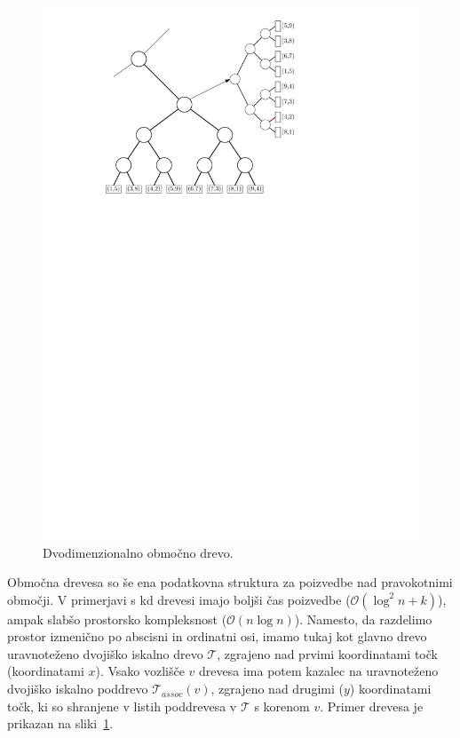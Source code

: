\documentclass[a4paper, 12pt]{book}
\newcommand{\T}{\ensuremath{\mathcal{T}}}
\newcommand{\OO}{\ensuremath{\mathcal{O}}} %
\begin{document}
\begin{figure}
\centerline{\includegraphics[scale=1]{pics/rangeTree2.pdf}}
\caption{Dvodimenzionalno območno drevo.}
\label{range-primer}
\end{figure}

Območna drevesa so še ena podatkovna struktura za poizvedbe nad pravokotnimi območji. V primerjavi s kd drevesi imajo boljši čas poizvedbe ($\OO(\log^2 n + k)$), ampak slabšo prostorsko kompleksnost ($\OO(n\log n)$). Namesto, da razdelimo prostor izmenično po abscisni in ordinatni osi, imamo tukaj kot glavno drevo uravnoteženo dvojiško iskalno drevo $\T$, zgrajeno nad prvimi koordinatami točk (koordinatami $x$). Vsako vozlišče $v$ drevesa ima potem kazalec na uravnoteženo dvojiško iskalno poddrevo $\T_{assoc}(v)$, zgrajeno nad drugimi ($y$) koordinatami točk, ki so shranjene v listih poddrevesa v $\T$ s korenom $v$. Primer drevesa je prikazan na sliki~\ref{range-primer}.
\end{document}
